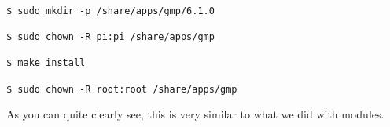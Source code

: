 \documentclass[]{article}
\begin{document}
                                                                                                                                                \begin{lstlisting}
                                                                                                                                                $ sudo mkdir -p /share/apps/gmp/6.1.0
                                                                                                                                                $ sudo chown -R pi:pi /share/apps/gmp
                                                                                                                                                $ make install
                                                                                                                                                $ sudo chown -R root:root /share/apps/gmp
                                                                                                                                                \end{lstlisting}
                                                                                                                                                As you can quite clearly see, this is very similar to what we did with modules.
\end{document}
